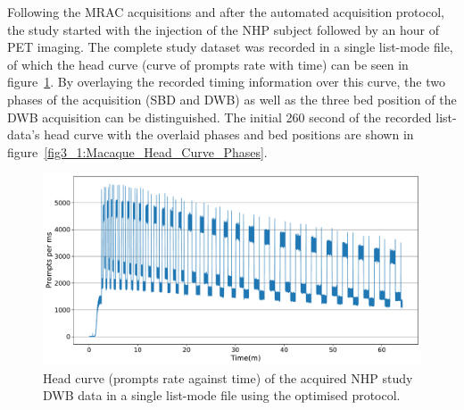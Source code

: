Following the MRAC acquisitions and after the automated acquisition protocol, the study started with the injection of the NHP subject followed by an hour of PET imaging. 
The complete study dataset was recorded in a single list-mode file, of which the head curve (curve of prompts rate with time) can be seen in figure~\ref{fig3_1:Macaque_Head_Curve}. By overlaying the recorded timing information over this curve, the two phases of the acquisition (SBD and DWB) as well as the three bed position of the DWB acquisition can be distinguished. The initial 260 second of the recorded list-data's head curve with the overlaid phases and bed positions are shown in figure~\ref{fig3_1:Macaque_Head_Curve_Phases}. 

\begin{figure} [ht!]
\centering
\includegraphics[scale=0.45,angle=0]{3_Results/3_1_DWB_Optimization/figures/3_1_Macaque_Head_Curve.pdf}
\caption{Head curve (prompts rate against time) of the acquired NHP study DWB data in a single list-mode file using the optimised protocol.}
\label{fig3_1:Macaque_Head_Curve}
\end{figure}

